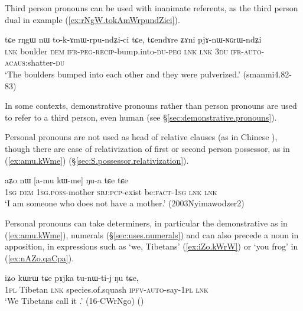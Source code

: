 Third person pronouns can be used with inanimate referents, as the third person dual  in example (\ref{ex:rNgW.tokAmWrpundZici}).

\begin{exe}
\ex \label{ex:rNgW.tokAmWrpundZici}
\gll tɕe rŋgɯ nɯ  to-k-ɤmɯ-rpu-ndʑi-ci tɕe, tɕendɤre ʑɤni pjɤ-nɯ-ɴɢrɯ-ndʑi   \\
\textsc{lnk} boulder \textsc{dem} \textsc{ifr}-\textsc{peg}-\textsc{recip}-bump.into-\textsc{du}-\textsc{peg} \textsc{lnk} \textsc{lnk} \textsc{3du} \textsc{ifr}-\textsc{auto}-\textsc{acaus}:shatter-\textsc{du} \\
\glt `The boulders bumped into each other and they were pulverized.' (smanmi4.82-83)
\end{exe}

In some contexts, demonstrative pronouns rather than person pronouns are used to refer to a third person, even human (see §\ref{sec:demonstrative.pronouns}).

Personal pronouns are not used as head of relative clauses (as in Chinese ), though there are case of relativization of first or second person possessor, as in (\ref{ex:amu.kWme}) (§\ref{sec:S.possessor.relativization}).

\begin{exe}
\ex \label{ex:amu.kWme}
\gll aʑo nɯ [a-mu kɯ-me] ŋu-a tɕe tɕe \\
\textsc{1sg} \textsc{dem} \textsc{1sg}.\textsc{poss}-mother \textsc{sbj}:\textsc{pcp}-exist be:\textsc{fact}-\textsc{1sg} \textsc{lnk} \textsc{lnk} \\
\glt `I am someone who does not have a mother.' (2003Nyimawodzer2)
\end{exe}

Personal pronouns can take determiners, in particular the demonstrative  as in (\ref{ex:amu.kWme}), numerals (§\ref{sec:uses.numerals}) and can also precede a noun in apposition, in expressions such as  `we, Tibetans' (\ref{ex:iZo.kWrW}) or  `you frog' in (\ref{ex:nAZo.qaCpa}).

\begin{exe}
\ex \label{ex:iZo.kWrW}
\gll iʑo kɯrɯ tɕe pɤjka tu-nɯ-ti-j ŋu tɕe, \\
\textsc{1pl} Tibetan \textsc{lnk} species.of.squash \textsc{ipfv}-\textsc{auto}-say-\textsc{1pl} \textsc{lnk} \\
\glt `We Tibetans call it .' (16-CWrNgo)
()
\end{exe}

